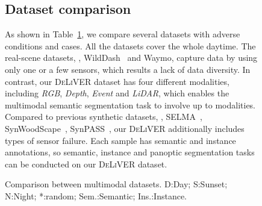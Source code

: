 \documentclass[10pt,twocolumn,letterpaper]{article}
\begin{document}
\begin{figure}[!t]
{\subsection{Dataset comparison}
\begin{table*}[!t]
\centering
\caption{
Comparison between multimodal datasets. D:Day; S:Sunset; N:Night; *:random; Sem.:Semantic; Ins.:Instance.
}
\label{tab:sup_dataset_comp}
\end{table*} As shown in Table~\ref{tab:sup_dataset_comp}, we compare several datasets with adverse conditions and cases.
All the datasets cover the whole daytime.
The real-scene datasets, \eg, WildDash~\cite{Zendel2018WildDashC} and Waymo\cite{Sun2020waymo}, capture data by using only one or a few sensors, which results a lack of data diversity. In contrast, our \textsc{DeLiVER} dataset has four different modalities, including \textit{RGB}, \textit{Depth}, \textit{Event} and \textit{LiDAR}, which enables the multimodal semantic segmentation task to involve up to  modalities. 
Compared to previous synthetic datasets, \eg, SELMA~\cite{testolina2022selma}, SynWoodScape~\cite{sekkat2022synwoodscape}, SynPASS~\cite{zhang2022trans4pass}, our \textsc{DeLiVER} additionally includes  types of sensor failure.
Each sample has semantic and instance annotations, so semantic, instance and panoptic segmentation tasks can be conducted on our \textsc{DeLiVER} dataset. 

}
\end{figure}
\end{document}

